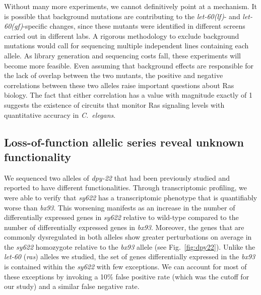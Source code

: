 \documentclass[10pt, onecolumn]{article}
\newcommand{\cel}{\emph{C.~elegans}}
\newcommand{\gene}[1]{\mbox{\emph{#1}}}
\newcommand{\ras}{\gene{let-60} (\emph{ras})}
\newcommand{\letgf}{\gene{let-60(gf)}}
\newcommand{\letlf}{\gene{let-60(lf)}}
\begin{document}
Without many more experiments, we cannot definitively point at a mechanism. It
is possible that background mutations are contributing to the \letlf{}- and
\letgf{}-specific changes, since these mutants were identified in different
screens carried out in different labs. A rigorous methodology to exclude
background mutations would call for sequencing multiple independent lines
containing each allele. As library generation and sequencing costs fall, these
experiments will become more feasible. Even assuming that background effects are
responsible for the lack of overlap between the two mutants, the positive and
negative correlations between these two alleles raise important questions about
Ras biology. The fact that either correlation has a value with magnitude exactly
of 1 suggests the existence of circuits that monitor Ras signaling levels with
quantitative accuracy in \cel{}.

\subsection*{Loss-of-function allelic series reveal unknown functionality}
We sequenced two alleles of \gene{dpy-22} that had been previously studied and
reported to have different functionalities. Through transcriptomic profiling, we
were able to verify that \emph{sy622} has a transcriptomic phenotype that is
quantifiably worse than \emph{bx93}. This worsening manifests as an increase in
the number of differentially expressed genes in \emph{sy622} relative to
wild-type compared to the number of differentially expressed genes in
\emph{bx93}. Moreover, the genes that are commonly dysregulated in both alleles
show greater perturbations on average in the \emph{sy622} homozygote relative to
the \emph{bx93} allele (see Fig.~\ref{fig:dpy22}). Unlike the \ras{} alleles we
studied, the set of genes differentially expressed in the \emph{bx93} is
contained within the \emph{sy622} with few exceptions. We can account for most
of these exceptions by invoking a 10\% false positive rate (which was the cutoff
for our study) and a similar false negative rate.
\end{document}
